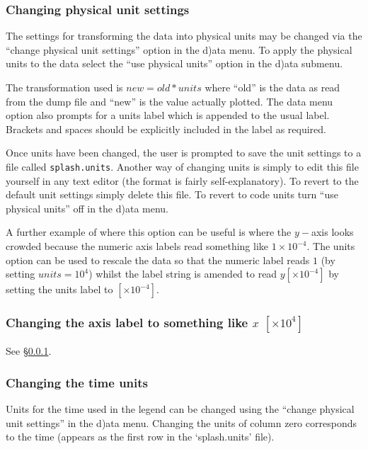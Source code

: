 \documentclass[a4paper,11pt]{article}
\begin{document}
\subsubsection{ Changing physical unit settings}
\label{sec:changingunits}
The settings for transforming the data into physical units may be changed via the ``change physical unit settings'' option in the d)ata menu. To apply the physical units to the data select the ``use physical units'' option in the d)ata submenu.

 The transformation used is $new= old*units$ where ``old'' is the data as read from the dump file and ``new'' is the value actually plotted. The data menu option also prompts for a units label which is appended to the usual label. Brackets and spaces should be explicitly included in the label as required.
 
  Once units have been changed, the user is prompted to save the unit settings to a file called \verb+splash.units+. Another way of changing units is simply to edit this file yourself in any text editor (the format is fairly self-explanatory). To revert to the default unit settings simply delete this file. To revert to code units turn ``use physical units'' off in the d)ata menu.
 
 A further example of where this option can be useful is where the $y-$axis looks crowded because the numeric axis labels read something
like $1\times 10^{-4}$. The units option can be used to rescale the data so
that the numeric label reads $1$ (by setting $units=10^{4}$) whilst the label string is amended to read $y
[\times 10^{-4}]$ by setting the units label to $ [ \times 10^{-4}]$.

\subsubsection{ Changing the axis label to something like $x$ $[ \times 10^{4} ]$}
See \S\ref{sec:changingunits}.

\subsubsection{ Changing the time units}
\label{sec:timeunits}
Units for the time used in the legend can be changed using the ``change physical unit settings'' in the d)ata menu. Changing the units of column zero corresponds to the time (appears as the first row in the `splash.units' file). 
\end{document}
